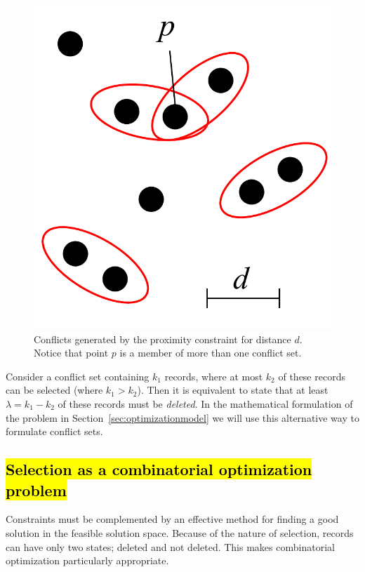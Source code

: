 \begin{figure}[htbp]
\begin{center}
\includegraphics[scale=.3]{figs/cvl_proximity_conflicts.pdf}
\caption{Conflicts generated by the proximity constraint for distance $d$. Notice that point $p$ is a member of more than one conflict set.}
\label{fig:proximity:conflict}
\end{center}
\end{figure}

Consider a conflict set containing $k_1$ records, where at most $k_2$ of these records can be selected (where $k_1 > k_2$). Then it is equivalent to state that at least $\lambda = k_1 - k_2$ of these records must be \emph{deleted}. In the mathematical formulation of the problem in Section~\ref{sec:optimizationmodel} we will use this alternative way to formulate conflict sets.

\subsection{\hl{Selection as a combinatorial optimization problem}}
\label{sec:filtering}
Constraints must be complemented by an effective method for finding a good solution in the feasible solution space. Because of the nature of selection, records can have only two states; deleted and not deleted. This makes combinatorial optimization particularly appropriate.

